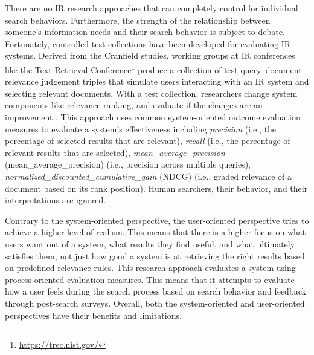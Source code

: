 There are no IR research approaches that can completely control for individual search behaviors. Furthermore, the strength of the relationship between someone's information needs and their search behavior is subject to debate. Fortunately, controlled test collections have been developed for evaluating IR systems. Derived from the Cranfield studies, working groups at IR conferences like the Text Retrieval Conference\footnote{\url{https://trec.nist.gov/}} produce a collection of test query–document–relevance judgement triples that simulate users interacting with an IR system \cite{Sanderson2010} and selecting relevant documents. With a test collection, researchers change system components like relevance ranking, and evaluate if the changes are an improvement \cite{McGill1979}. This approach uses common system-oriented outcome evaluation measures to evaluate a system's effectiveness including \emph{\gls{precision}} (i.e., the percentage of selected results that are relevant), \emph{\gls{recall}} (i.e., the percentage of relevant results that are selected), \emph{\gls{mean_average_precision}} (\acrshort{mean_average_precision}) (i.e., precision across multiple queries), \emph{\gls{normalized_discounted_cumulative_gain}} (\acrshort{NDCG}) (i.e., graded relevance of a document based on its rank position). Human searchers, their behavior, and their interpretations are ignored.

Contrary to the system-oriented perspective, the user-oriented perspective tries to achieve a higher level of realism. This means that there is a higher focus on what users want out of a system, what results they find useful, and what ultimately satisfies them, not just how good a system is at retrieving the right results based on predefined relevance rules. This research approach evaluates a system using process-oriented evaluation measures. This means that it attempts to evaluate how a user feels during the search process based on search behavior and feedback through post-search surveys. Overall, both the system-oriented and user-oriented perspectives have their benefits and limitations.



